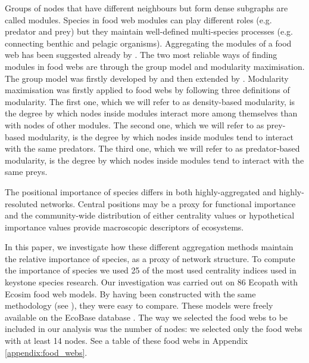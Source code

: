 \documentclass[twocolumn]{article}
\begin{document}
	Groups of nodes that have different neighbours but form dense subgraphs are called modules. Species in food web modules can play different roles (e.g. predator and prey) but they maintain well-defined multi-species processes (e.g. connecting benthic and pelagic organisms). Aggregating the modules of a food web has been suggested already by \citet{Allesina2009a}. The two most reliable ways of finding modules in food webs are through the group model and modularity maximisation. The group model was firstly developed by \citet{Allesina2009a} and then extended by \citet{Sander2015}.	Modularity maximisation was firstly applied to food webs by \citet{Guimera2010} following three definitions of modularity.	The first one, which we will refer to as density-based modularity, is the degree by which nodes inside modules interact more among themselves than with nodes of other modules.	The second one, which we will refer to as prey-based modularity, is the degree by which nodes inside modules tend to interact with the same predators.	The third one, which we will refer to as predator-based modularity, is the degree by which nodes inside modules tend to interact with the same preys.

	The positional importance of species differs in both highly-aggregated and highly-resoluted networks. Central positions may be a proxy for functional importance and the community-wide distribution of either centrality values \citep{Bauer2010} or hypothetical importance values \citep{Mills1993} provide macroscopic descriptors of ecosystems.

	In this paper, we investigate how these different aggregation methods maintain the relative importance of species, as a proxy of network structure.
	To compute the importance of species we used 25 of the most used centrality indices used in keystone species research.
	Our investigation was carried out on 86 Ecopath with Ecosim food web models. By having been constructed with the same methodology (see \citet{Okey2004}), they were easy to compare. These models were freely available on the EcoBase database \citep{Colleter2013}. The way we selected the food webs to be included in our analysis was the number of nodes: we selected only the food webs with at least 14 nodes.  See a table of these food webs in Appendix \ref{appendix:food_webs}. %
\end{document}
